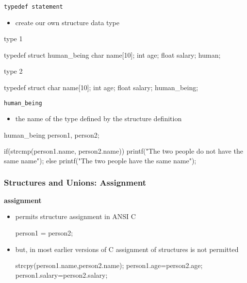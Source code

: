 \documentclass[newPxFont,sthlmFooter,nooffset]{beamer}
\begin{document}
\begin{frame}
 

\framebreak


\texttt{typedef statement}
\begin{itemize}
\item create our own structure data type
\end{itemize}

type 1
\begin{codedef}
typedef struct human_being { 
    char name[10];
    int age;
    float salary;
} human;
\end{codedef}

type 2
\begin{codedef}
typedef struct { 
    char name[10]; 
    int age;
    float salary;
} human_being;
\end{codedef}

\framebreak


\texttt{human\_being}  
\begin{itemize}
\item the name of the type defined by the structure definition
\end{itemize}

\begin{codedef}
human_being person1, person2;

if(strcmp(person1.name, person2.name)) 
    printf("The two people do not have the same name\n");
else
    printf("The two people have the same name\n");
\end{codedef}
\end{frame}


\begin{frame}[t, fragile]
  \frametitle{Structures and Unions: Assignment}
\textbf{assignment}
\begin{itemize}
\item permits structure assignment in ANSI C

\begin{codedef}
  person1 = person2;
\end{codedef}
\item but, in most earlier versions of C assignment of structures is not permitted
\begin{codedef}
   strcpy(person1.name,person2.name); 
   person1.age=person2.age; 
   person1.salary=person2.salary;    
\end{codedef}
\end{itemize}
\end{frame}
\end{document}
